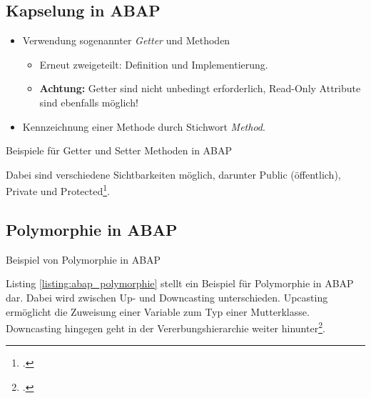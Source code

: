 \subsection{Kapselung in ABAP}
\begin{itemize}
  \item Verwendung sogenannter \textit{Getter} und  Methoden
  \begin{itemize}
    \item Erneut zweigeteilt: Definition und Implementierung.
    \item \textbf{Achtung:} Getter sind nicht unbedingt erforderlich, Read-Only Attribute sind ebenfalls möglich!
  \end{itemize}
  \item Kennzeichnung einer Methode durch Stichwort \textit{Method}.
\end{itemize}

\begin{listing}[ht]{}
  \caption{Beispiele für Getter und Setter Methoden in ABAP}
  \label{listing:abap_getter_setter}
\end{listing}
Dabei sind verschiedene Sichtbarkeiten möglich, darunter Public (öffentlich), Private und Protected\footcite[Vgl.][S. 83]{woodObjectorientedProgrammingABAP2016}.

\subsection{Polymorphie in ABAP}


\newenvironment{code}{\captionsetup{type=listing}}{}
\begin{code}
\caption{Beispiel von Polymorphie in ABAP\protect\footnotemark}
\label{listing:abap_polymorphie}
\end{code}
Listing \ref{listing:abap_polymorphie} stellt ein Beispiel für Polymorphie in ABAP dar. Dabei wird zwischen Up- und Downcasting unterschieden. Upcasting ermöglicht die Zuweisung einer Variable zum Typ einer Mutterklasse. Downcasting hingegen geht in der Vererbungshierarchie weiter hinunter\footcite[Vgl.][S. 73 ff.]{zaidiSAPABAPObjects2019}.